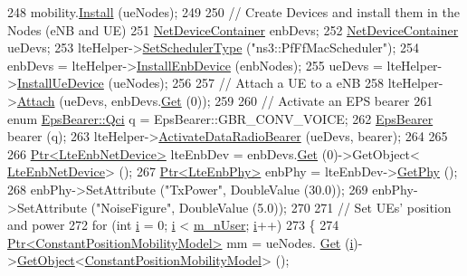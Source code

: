 \begin{DoxyCode}
248   mobility.\hyperlink{classns3_1_1MobilityHelper_a07737960ee95c0777109cf2994dd97ae}{Install} (ueNodes);
249 
250   \textcolor{comment}{// Create Devices and install them in the Nodes (eNB and UE)}
251   \hyperlink{classns3_1_1NetDeviceContainer}{NetDeviceContainer} enbDevs;
252   \hyperlink{classns3_1_1NetDeviceContainer}{NetDeviceContainer} ueDevs;
253   lteHelper->\hyperlink{classns3_1_1LteHelper_a8f86e55b8b80a81732c4b2df00fb25d5}{SetSchedulerType} (\textcolor{stringliteral}{"ns3::PfFfMacScheduler"});
254   enbDevs = lteHelper->\hyperlink{classns3_1_1LteHelper_a5e009ad35ef85f46b5a6099263f15a03}{InstallEnbDevice} (enbNodes);
255   ueDevs = lteHelper->\hyperlink{classns3_1_1LteHelper_ac9cd932d7de92811cfa953c2e3b2fc9f}{InstallUeDevice} (ueNodes);
256 
257   \textcolor{comment}{// Attach a UE to a eNB}
258   lteHelper->\hyperlink{classns3_1_1LteHelper_a9466743f826aa2652a87907b7f0a1c87}{Attach} (ueDevs, enbDevs.\hyperlink{classns3_1_1NetDeviceContainer_a677d62594b5c9d2dea155cc5045f4d0b}{Get} (0));
259 
260   \textcolor{comment}{// Activate an EPS bearer}
261   \textcolor{keyword}{enum} \hyperlink{structns3_1_1EpsBearer_aecf0c67109c5eb4ec0b07226fff5885e}{EpsBearer::Qci} q = EpsBearer::GBR\_CONV\_VOICE;
262   \hyperlink{structns3_1_1EpsBearer}{EpsBearer} bearer (q);
263   lteHelper->\hyperlink{classns3_1_1LteHelper_ac896e16cf162e4beeaa292d39ab1b700}{ActivateDataRadioBearer} (ueDevs, bearer);
264   
265  
266   \hyperlink{classns3_1_1Ptr}{Ptr<LteEnbNetDevice>} lteEnbDev = enbDevs.\hyperlink{classns3_1_1NetDeviceContainer_a677d62594b5c9d2dea155cc5045f4d0b}{Get} (0)->GetObject<
      \hyperlink{classns3_1_1LteEnbNetDevice}{LteEnbNetDevice}> ();
267   \hyperlink{classns3_1_1Ptr}{Ptr<LteEnbPhy>} enbPhy = lteEnbDev->\hyperlink{classns3_1_1LteEnbNetDevice_a58db72130e0740f16a5e03b22e4a10a4}{GetPhy} ();
268   enbPhy->SetAttribute (\textcolor{stringliteral}{"TxPower"}, DoubleValue (30.0));
269   enbPhy->SetAttribute (\textcolor{stringliteral}{"NoiseFigure"}, DoubleValue (5.0));
270 
271   \textcolor{comment}{// Set UEs' position and power}
272   \textcolor{keywordflow}{for} (\textcolor{keywordtype}{int} \hyperlink{bernuolliDistribution_8m_a6f6ccfcf58b31cb6412107d9d5281426}{i} = 0; \hyperlink{bernuolliDistribution_8m_a6f6ccfcf58b31cb6412107d9d5281426}{i} < \hyperlink{classLenaPfFfMacSchedulerTestCase1_a1d8b06961a8b7e440f643688069b9c7a}{m\_nUser}; \hyperlink{bernuolliDistribution_8m_a6f6ccfcf58b31cb6412107d9d5281426}{i}++)
273     \{
274       \hyperlink{classns3_1_1Ptr}{Ptr<ConstantPositionMobilityModel>} mm = ueNodes.
      \hyperlink{classns3_1_1NodeContainer_a9ed96e2ecc22e0f5a3d4842eb9bf90bf}{Get} (\hyperlink{bernuolliDistribution_8m_a6f6ccfcf58b31cb6412107d9d5281426}{i})->\hyperlink{classns3_1_1Object_a13e18c00017096c8381eb651d5bd0783}{GetObject}<\hyperlink{classns3_1_1ConstantPositionMobilityModel}{ConstantPositionMobilityModel}> ();

\end{DoxyCode}
